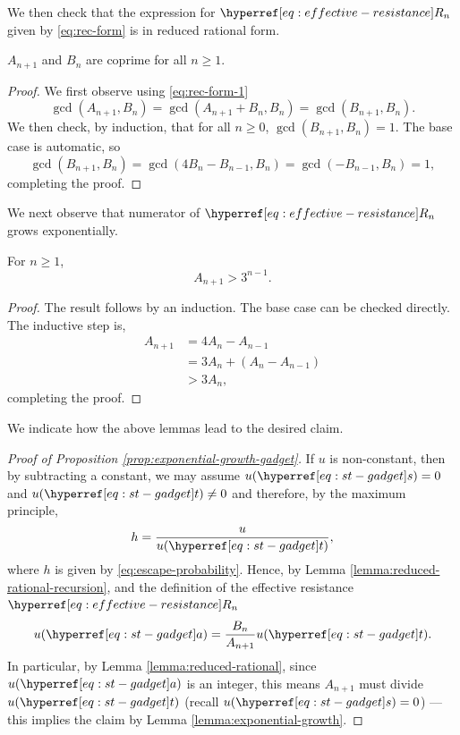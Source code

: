 \documentclass[12pt]{amsart}
\numberwithin{equation}{section}
\begin{document}
	We then check that the expression for $\Rn{n}$ given by \eqref{eq:rec-form} is in reduced rational form. 
	\begin{lemma} \label{lemma:reduced-rational}
		$A_{n+1}$ and $B_{n}$ are coprime for all $n \geq 1$. 
	\end{lemma}
	\begin{proof}
		We first observe using \eqref{eq:rec-form-1}
		\[
		\gcd(A_{n+1}, B_n) = \gcd(A_{n+1} +  B_n, B_n) = \gcd(B_{n+1}, B_n).
		\]
		We then check, by induction, that for all $n \geq 0$, $ \gcd(B_{n+1}, B_n) = 1$. The base case is automatic, so
		\[
		\gcd(B_{n+1}, B_n) = \gcd( 4 B_{n} - B_{n-1}, B_n)  = \gcd(-B_{n-1}, B_n) = 1,
		\]
		completing the proof.
	\end{proof}
	We next observe that numerator of $\Rn{n}$ grows exponentially.
	\begin{lemma} \label{lemma:exponential-growth}
		For $n \geq 1$, 
		\[
		A_{n+1} > 3^{n-1}.
		\]
	\end{lemma}
	\begin{proof}
		The result follows by an induction. The base case can be checked directly. The inductive step is, 
		\begin{align*}
			A_{n+1} &= 4 A_{n} - A_{n-1} \\
			&= 3 A_n + (A_n - A_{n-1}) \\
			&> 3 A_n,
		\end{align*}
		completing the proof. 
	\end{proof}
	
	We indicate how the above lemmas lead to the desired claim. 
	\begin{proof}[Proof of Proposition \ref{prop:exponential-growth-gadget}]
		If $u$ is non-constant, then by subtracting a constant, we may assume $u(\sgadget) = 0$ and $u(\tgadget) \neq 0$ and therefore, by the maximum principle, 
		\[
		h =  \frac{u}{u(\tgadget)},
		\]
		where $h$ is given by \eqref{eq:escape-probability}. Hence, by Lemma \ref{lemma:reduced-rational-recursion},
		and the definition of the effective resistance $\Rn{n}$
		\[
		u(\agadget) =  \frac{B_n}{A_{n+1}} u(\tgadget).
		\]
		In particular, by Lemma \ref{lemma:reduced-rational},  since $u(\agadget)$ is an integer, this means $A_{n+1}$ must divide $u(\tgadget)$ (recall $u(\sgadget) = 0$) --- this implies the claim by Lemma \ref{lemma:exponential-growth}.
	\end{proof}
	
\end{document}

